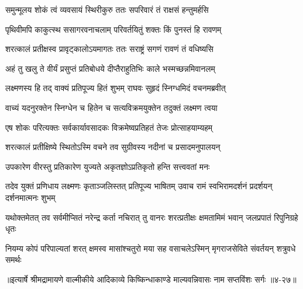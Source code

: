 \twolineshloka
{समुन्मूलय शोकं त्वं व्यवसायं स्थिरीकुरु}
{ततः सपरिवारं तं राक्षसं हन्तुमर्हसि} %

\twolineshloka
{पृथिवीमपि काकुत्स्थ ससागरवनाचलाम्}
{परिवर्तयितुं शक्तः किं पुनस्तं हि रावणम्} %

\twolineshloka
{शरत्कालं प्रतीक्षस्व प्रावृट्कालोऽयमागतः}
{ततः सराष्ट्रं सगणं रावणं तं वधिष्यसि} %

\twolineshloka
{अहं तु खलु ते वीर्यं प्रसुप्तं प्रतिबोधये}
{दीप्तैराहुतिभिः काले भस्मच्छन्नमिवानलम्} %

\twolineshloka
{लक्ष्मणस्य हि तद् वाक्यं प्रतिपूज्य हितं शुभम्}
{राघवः सुहृदं स्निग्धमिदं वचनमब्रवीत्} %

\twolineshloka
{वाच्यं यदनुरक्तेन स्निग्धेन च हितेन च}
{सत्यविक्रमयुक्तेन तदुक्तं लक्ष्मण त्वया} %

\twolineshloka
{एष शोकः परित्यक्तः सर्वकार्यावसादकः}
{विक्रमेष्वप्रतिहतं तेजः प्रोत्साहयाम्यहम्} %

\twolineshloka
{शरत्कालं प्रतीक्षिष्ये स्थितोऽस्मि वचने तव}
{सुग्रीवस्य नदीनां च प्रसादमनुपालयन्} %

\twolineshloka
{उपकारेण वीरस्तु प्रतिकारेण युज्यते}
{अकृतज्ञोऽप्रतिकृतो हन्ति सत्त्ववतां मनः} %

\twolineshloka
{तदेव युक्तं प्रणिधाय लक्ष्मणः कृताञ्जलिस्तत् प्रतिपूज्य भाषितम्}
{उवाच रामं स्वभिरामदर्शनं प्रदर्शयन् दर्शनमात्मनः शुभम्} %

\twolineshloka
{यथोक्तमेतत् तव सर्वमीप्सितं नरेन्द्र कर्ता नचिरात् तु वानरः}
{शरत्प्रतीक्षः क्षमतामिमं भवान् जलप्रपातं रिपुनिग्रहे धृतः} %

\twolineshloka
{नियम्य कोपं परिपाल्यतां शरत् क्षमस्व मासांश्चतुरो मया सह}
{वसाचलेऽस्मिन् मृगराजसेविते संवर्तयन् शत्रुवधे समर्थः} %


॥इत्यार्षे श्रीमद्रामायणे वाल्मीकीये आदिकाव्ये किष्किन्धाकाण्डे माल्यवन्निवासः नाम सप्तविंशः सर्गः ॥४-२७॥
